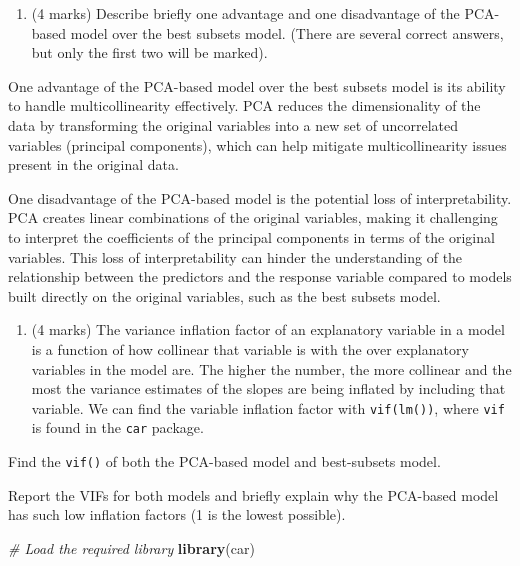 \documentclass[
]{article}
\newenvironment{Shaded}{\begin{snugshade}}{\end{snugshade}}
\newcommand{\CommentTok}[1]{\textcolor[rgb]{0.56,0.35,0.01}{\textit{#1}}}
\newcommand{\FunctionTok}[1]{\textcolor[rgb]{0.13,0.29,0.53}{\textbf{#1}}}
\newcommand{\NormalTok}[1]{#1}
\providecommand{\tightlist}{%
  \setlength{\itemsep}{0pt}\setlength{\parskip}{0pt}}
\begin{document}
\begin{enumerate}
\def\labelenumi{\arabic{enumi}.}
\setcounter{enumi}{7}
\tightlist
\item
  (4 marks) Describe briefly one advantage and one disadvantage of the
  PCA-based model over the best subsets model. (There are several
  correct answers, but only the first two will be marked).
\end{enumerate}

One advantage of the PCA-based model over the best subsets model is its
ability to handle multicollinearity effectively. PCA reduces the
dimensionality of the data by transforming the original variables into a
new set of uncorrelated variables (principal components), which can help
mitigate multicollinearity issues present in the original data.

One disadvantage of the PCA-based model is the potential loss of
interpretability. PCA creates linear combinations of the original
variables, making it challenging to interpret the coefficients of the
principal components in terms of the original variables. This loss of
interpretability can hinder the understanding of the relationship
between the predictors and the response variable compared to models
built directly on the original variables, such as the best subsets
model.

\vspace{2cm}

\newpage

\begin{enumerate}
\def\labelenumi{\arabic{enumi}.}
\setcounter{enumi}{8}
\tightlist
\item
  (4 marks) The variance inflation factor of an explanatory variable in
  a model is a function of how collinear that variable is with the over
  explanatory variables in the model are. The higher the number, the
  more collinear and the most the variance estimates of the slopes are
  being inflated by including that variable. We can find the variable
  inflation factor with \texttt{vif(lm())}, where \texttt{vif} is found
  in the \texttt{car} package.
\end{enumerate}

Find the \texttt{vif()} of both the PCA-based model and best-subsets
model.

Report the VIFs for both models and briefly explain why the PCA-based
model has such low inflation factors (1 is the lowest possible).

\begin{Shaded}
\begin{Highlighting}[]
\CommentTok{\# Load the required library}
\FunctionTok{library}\NormalTok{(car)}
\end{Highlighting}
\end{Shaded}
\end{document}
